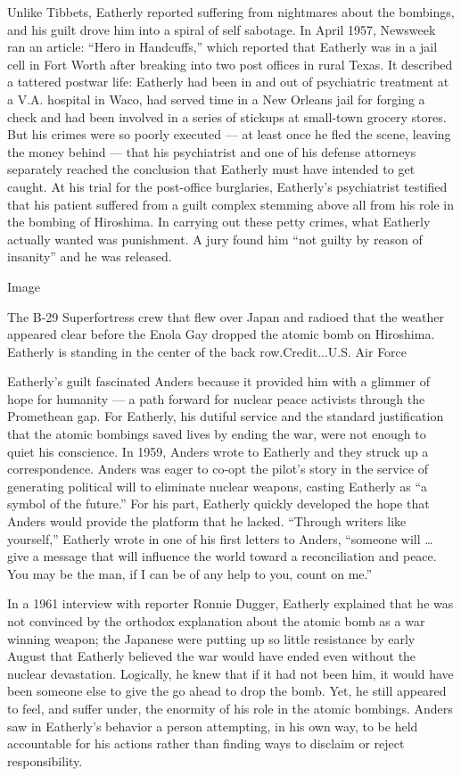 Unlike Tibbets, Eatherly reported suffering from nightmares about the
bombings, and his guilt drove him into a spiral of self sabotage. In
April 1957, Newsweek ran an article: ``Hero in Handcuffs,'' which
reported that Eatherly was in a jail cell in Fort Worth after breaking
into two post offices in rural Texas. It described a tattered postwar
life: Eatherly had been in and out of psychiatric treatment at a V.A.
hospital in Waco, had served time in a New Orleans jail for forging a
check and had been involved in a series of stickups at small-town
grocery stores. But his crimes were so poorly executed --- at least once
he fled the scene, leaving the money behind --- that his psychiatrist
and one of his defense attorneys separately reached the conclusion that
Eatherly must have intended to get caught. At his trial for the
post-office burglaries, Eatherly's psychiatrist testified that his
patient suffered from a guilt complex stemming above all from his role
in the bombing of Hiroshima. In carrying out these petty crimes, what
Eatherly actually wanted was punishment. A jury found him ``not guilty
by reason of insanity'' and he was released.

Image

The B-29 Superfortress crew that flew over Japan and radioed that the
weather appeared clear before the Enola Gay dropped the atomic bomb on
Hiroshima. Eatherly is standing in the center of the back
row.Credit...U.S. Air Force

Eatherly's guilt fascinated Anders because it provided him with a
glimmer of hope for humanity --- a path forward for nuclear peace
activists through the Promethean gap. For Eatherly, his dutiful service
and the standard justification that the atomic bombings saved lives by
ending the war, were not enough to quiet his conscience. In 1959, Anders
wrote to Eatherly and they struck up a correspondence. Anders was eager
to co-opt the pilot's story in the service of generating political will
to eliminate nuclear weapons, casting Eatherly as ``a symbol of the
future.'' For his part, Eatherly quickly developed the hope that Anders
would provide the platform that he lacked. ``Through writers like
yourself,'' Eatherly wrote in one of his first letters to Anders,
``someone will \ldots{} give a message that will influence the world
toward a reconciliation and peace. You may be the man, if I can be of
any help to you, count on me.''

In a 1961 interview with reporter Ronnie Dugger, Eatherly explained that
he was not convinced by the orthodox explanation about the atomic bomb
as a war winning weapon; the Japanese were putting up so little
resistance by early August that Eatherly believed the war would have
ended even without the nuclear devastation. Logically, he knew that if
it had not been him, it would have been someone else to give the go
ahead to drop the bomb. Yet, he still appeared to feel, and suffer
under, the enormity of his role in the atomic bombings. Anders saw in
Eatherly's behavior a person attempting, in his own way, to be held
accountable for his actions rather than finding ways to disclaim or
reject responsibility.

